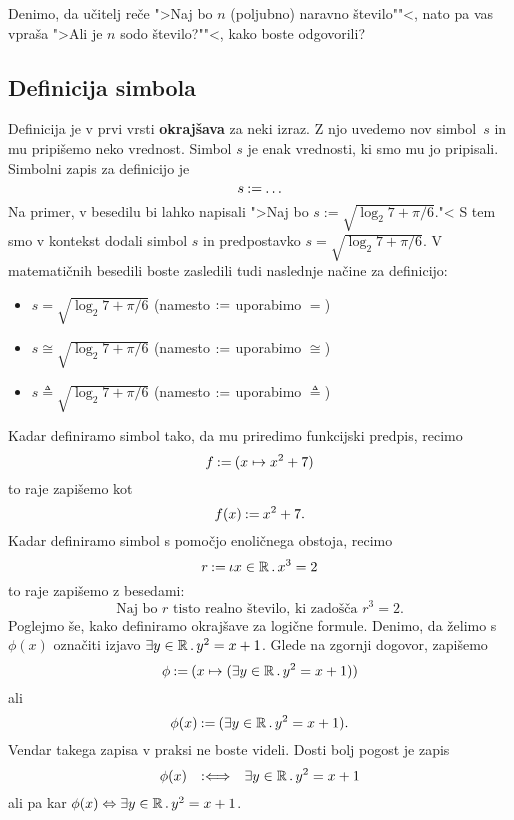 \begin{naloga}
  Denimo, da učitelj reče ">Naj bo $n$ (poljubno) naravno število""<, nato pa vas vpraša ">Ali je $n$ sodo število?""<, kako boste odgovorili?
\end{naloga}

\subsection{Definicija simbola}

Definicija je v prvi vrsti \textbf{okrajšava} za neki izraz. Z njo uvedemo nov simbol~$s$ in mu pripišemo neko vrednost. Simbol $s$ je enak vrednosti, ki smo mu jo pripisali. Simbolni zapis za definicijo je
%
\begin{equation*}
  s \mathbin{{:}{=}} \ldots
\end{equation*}
%
Na primer, v besedilu bi lahko napisali ">Naj bo $s := \sqrt{\log_2 7 + \pi/6}$."< S tem smo v kontekst dodali simbol $s$ in predpostavko $s = \sqrt{\log_2 7 + \pi/6}$. V matematičnih besedili boste zasledili tudi naslednje načine za definicijo:
%
\begin{itemize}
\item $s = \sqrt{\log_2 7 + \pi/6}$ (namesto $\mathbin{{:}{=}}$ uporabimo $=$)
\item $s \cong \sqrt{\log_2 7 + \pi/6}$ (namesto $\mathbin{{:}{=}}$ uporabimo $\cong$)
\item $s \triangleq \sqrt{\log_2 7 + \pi/6}$ (namesto $\mathbin{{:}{=}}$ uporabimo $\triangleq$)
\end{itemize}
%
Kadar definiramo simbol tako, da mu priredimo funkcijski predpis, recimo
%
\begin{equation*}
  f \mathbin{{:}{=}} (x \mapsto x^2 + 7)
\end{equation*}
%
to raje zapišemo kot
%
\begin{equation*}
  f(x) \mathbin{{:}{=}} x^2 + 7.
\end{equation*}
%
Kadar definiramo simbol s pomočjo enoličnega obstoja, recimo
%
\begin{equation*}
  r \mathbin{{:}{=}} \iota x \in \mathbb{R} \,.\, x^3 = 2
\end{equation*}
%
to raje zapišemo z besedami:
%
\begin{equation*}
  \text{Naj bo $r$ tisto realno število, ki zadošča $r^3 = 2$.}
\end{equation*}
%
Poglejmo še, kako definiramo okrajšave za logične formule. Denimo, da želimo s $\phi(x)$ označiti izjavo $\exists y \in \mathbb{R} \,.\, y^2 = x + 1$. Glede na zgornji dogovor, zapišemo
%
\begin{equation*}
  \phi \mathbin{{:}{=}} (x \mapsto (\exists y \in \mathbb{R} \,.\, y^2 = x + 1))
\end{equation*}
%
ali
%
\begin{equation*}
  \phi(x) \mathbin{{:}{=}} (\exists y \in \mathbb{R} \,.\, y^2 = x + 1).
\end{equation*}
%
Vendar takega zapisa v praksi ne boste videli. Dosti bolj pogost je zapis
%
\begin{equation*}
  \phi(x) \quad {{:}{\Longleftrightarrow}}\quad \exists y \in \mathbb{R} \,.\, y^2 = x + 1
\end{equation*}
%
ali pa kar $\phi(x) \Leftrightarrow \exists y \in \mathbb{R} \,.\, y^2 = x + 1$.

